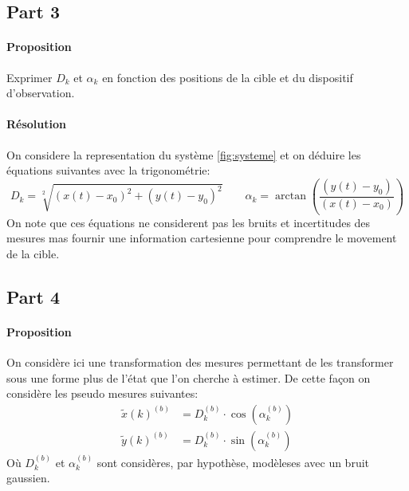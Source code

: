 \documentclass{article}
\begin{document}
\subsection{Part 3}
\paragraph{Proposition}Exprimer $D_k$ et $\alpha_k$ en fonction des positions de la cible et du dispositif d'observation.

\paragraph{Résolution}On considere la representation du système \ref{fig:systeme} et on déduire les équations suivantes avec la trigonométrie:
\begin{equation}
    \boxed{D_{k} = \sqrt[2]{(x(t) - x_{0})^2 + (y(t) - y_{0})^2}}
    \qquad
    \boxed{\alpha_{k} = \arctan\left( \frac{(y(t) - y_{0})}{(x(t) - x_{0})} \right)}
\end{equation}
On note que ces équations ne considerent pas les bruits et incertitudes des mesures mas fournir une information cartesienne pour comprendre le movement de la cible.

\subsection{Part 4}
\paragraph{Proposition}On considère ici une transformation des mesures permettant de les transformer sous une forme plus de l'état que l'on cherche à estimer. De cette façon on considère les pseudo mesures suivantes:
\begin{align*}
    \tilde{x}(k)^{(b)} &= D_{k}^{(b)} \cdot \cos(\alpha_{k}^{(b)})\\
    \tilde{y}(k)^{(b)} &= D_{k}^{(b)} \cdot \sin(\alpha_{k}^{(b)})
\end{align*}
Où $D_{k}^{(b)}$ et $\alpha_{k}^{(b)}$ sont considères, par hypothèse, modèleses avec un bruit gaussien.
\end{document}
